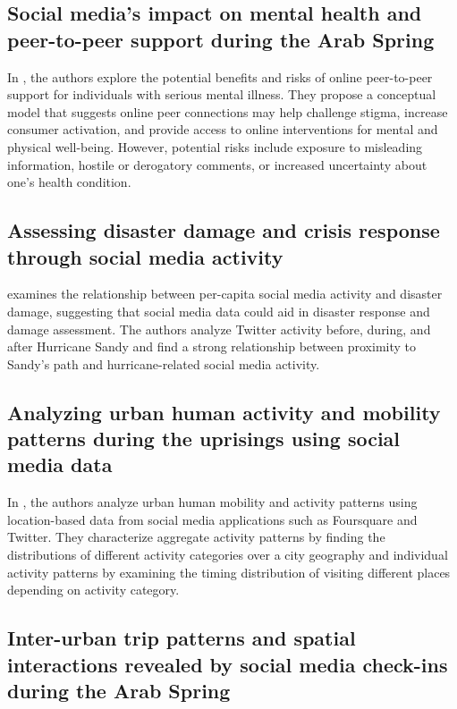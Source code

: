 \documentclass{article}
\begin{document}
\subsection{Social media's impact on mental health and peer-to-peer support during the Arab Spring}

In \cite{Naslund2016TheFO}, the authors explore the potential benefits and risks of online peer-to-peer support for individuals with serious mental illness. They propose a conceptual model that suggests online peer connections may help challenge stigma, increase consumer activation, and provide access to online interventions for mental and physical well-being. However, potential risks include exposure to misleading information, hostile or derogatory comments, or increased uncertainty about one's health condition.

\subsection{Assessing disaster damage and crisis response through social media activity}

\cite{Kryvasheyeu2016RapidAO} examines the relationship between per-capita social media activity and disaster damage, suggesting that social media data could aid in disaster response and damage assessment. The authors analyze Twitter activity before, during, and after Hurricane Sandy and find a strong relationship between proximity to Sandy's path and hurricane-related social media activity.

\subsection{Analyzing urban human activity and mobility patterns during the uprisings using social media data}

In \cite{Hasan2013UnderstandingUH}, the authors analyze urban human mobility and activity patterns using location-based data from social media applications such as Foursquare and Twitter. They characterize aggregate activity patterns by finding the distributions of different activity categories over a city geography and individual activity patterns by examining the timing distribution of visiting different places depending on activity category.

\subsection{Inter-urban trip patterns and spatial interactions revealed by social media check-ins during the Arab Spring}
\end{document}
